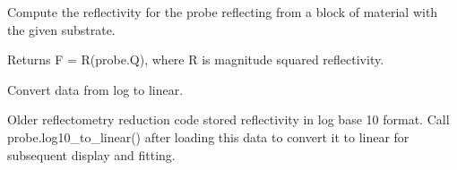 \documentclass[letterpaper,10pt,english]{sphinxmanual}
\begin{document}
\begin{fulllineitems}
\begin{fulllineitems}
\end{fulllineitems}


\begin{fulllineitems}
\label{api/probe:refl1d.probe.NeutronProbe.data}
\end{fulllineitems}


\begin{fulllineitems}
\label{api/probe:refl1d.probe.NeutronProbe.fresnel}
Compute the reflectivity for the probe reflecting from a block of
material with the given substrate.

Returns F = R(probe.Q), where R is magnitude squared reflectivity.

\end{fulllineitems}


\begin{fulllineitems}
\label{api/probe:refl1d.probe.NeutronProbe.label}
\end{fulllineitems}


\begin{fulllineitems}
\label{api/probe:refl1d.probe.NeutronProbe.log10_to_linear}
Convert data from log to linear.

Older reflectometry reduction code stored reflectivity in log base 10
format.  Call probe.log10\_to\_linear() after loading this data to
convert it to linear for subsequent display and fitting.

\end{fulllineitems}


\begin{fulllineitems}
\label{api/probe:refl1d.probe.NeutronProbe.name}
\end{fulllineitems}



\end{fulllineitems}
\end{document}
